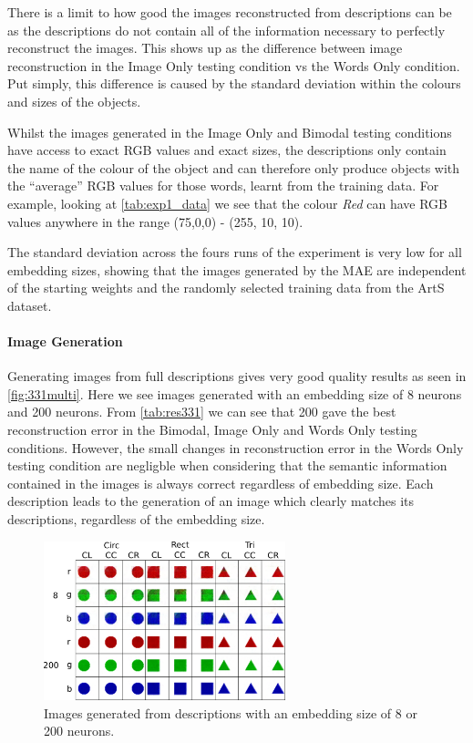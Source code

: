 There is a limit to how good the images reconstructed from descriptions can be as the descriptions do not contain all of the information necessary to perfectly reconstruct the images. This shows up as the difference between image reconstruction in the Image Only testing condition vs the Words Only condition. Put simply, this difference is caused by the standard deviation within the colours and sizes of the objects. 

Whilst the images generated in the Image Only and Bimodal testing conditions have access to exact \ac{RGB} values and exact sizes, the descriptions only contain the name of the colour of the object and can therefore only produce objects with the ``average'' \ac{RGB} values for those words, learnt from the training data. For example, looking at \autoref{tab:exp1_data} we see that the colour \textit{Red} can have RGB values anywhere in the range (75,0,0) - (255, 10, 10).

The standard deviation across the fours runs of the experiment is very low for all embedding sizes, showing that the images generated by the \ac{MAE} are independent of the starting weights and the randomly selected training data from the ArtS dataset. 

\paragraph{Image Generation}

Generating images from full descriptions gives very good quality results as seen in \autoref{fig:331multi}. Here we see images generated with an embedding size of 8 neurons and 200 neurons. From \autoref{tab:res331} we can see that 200 gave the best reconstruction error in the Bimodal, Image Only and Words Only testing conditions. However, the small changes in reconstruction error in the Words Only testing condition are negligble when considering that the semantic information contained in the images is always correct regardless of embedding size. Each description leads to the generation of an image which clearly matches its descriptions, regardless of the embedding size. 

\begin{figure}
\centering
\includegraphics[width=0.625\textwidth]{Figs/shapes/331_8v200.png}
\caption{Images generated from descriptions with an embedding size of 8 or 200 neurons.}
\label{fig:331multi}
\end{figure}

